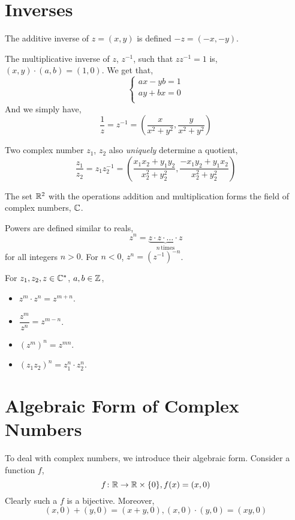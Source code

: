 \section{Inverses}

The additive inverse of \(z = (x, y)\) is defined \(-z = (-x, -y)\). 

The multiplicative inverse of \(z\), \(z^{-1}\), such that \(zz^{-1} = 1\) is,
\((x,y) \cdot (a,b) = (1, 0)\). We get that,
\[
    \begin{cases}
        ax - yb = 1 \\
        ay + bx = 0 \\
    \end{cases}\] 
 And we simply have,
 \[
    \frac{1}{z} = z^{-1} = \left(\frac{x}{x^2 + y^2}, \frac{y}{x^2 + y^2} \right)
\]

Two complex number \(z_1\), \(z_2\) also \emph{uniquely} determine a quotient,
\[\frac{z_1}{z_2} = z_1z_{2}^{-1} = \left(\frac{x_1x_2 + y_1y_2}{x_{2}^{2} + y_{2}^{2}},
\frac{-x_1y_2 + y_1x_2}{x_{2}^{2} + y_{2}^{2}} \right)\]

The set \(\mathbb R^2\) with the operations addition and multiplication forms the field of 
complex numbers, \(\mathbb C\). 

Powers are defined similar to reals,
\[
    z^n = \underbrace{z\cdot z \cdot \dots \cdot z}_{n \, \text{times}}\]%
for all integers \(n > 0\). For \(n < 0\), \(z^{n} = (z^{-1})^{-n}\). 


\begin{proposition}
    For \(z_1, z_2, z \in \mathbb C^*\), \(a, b \in \mathbb Z\),
    \begin{itemize}
        \item \(z^m \cdot z^n = z^{m + n}\).
        \item \(\dfrac{z^m}{z^n} = z^{m-n}\).
        \item \((z^m)^n = z^{mn}\).
        \item \((z_1z_2)^n = z_{1}^n \cdot z_{2}^n\).
    \end{itemize}
\end{proposition}

\section{Algebraic Form of Complex Numbers}

To deal with complex numbers, we introduce their algebraic form. 
Consider a function \(f\),
\[
    f \colon \mathbb R \to \mathbb R \times \{0\}, f(x) = (x, 0)\]%
Clearly such a \(f\) is a bijective. Moreover, 
\[(x, 0) + (y, 0) = (x + y, 0), (x,0) \cdot (y, 0) = (xy, 0)\]

